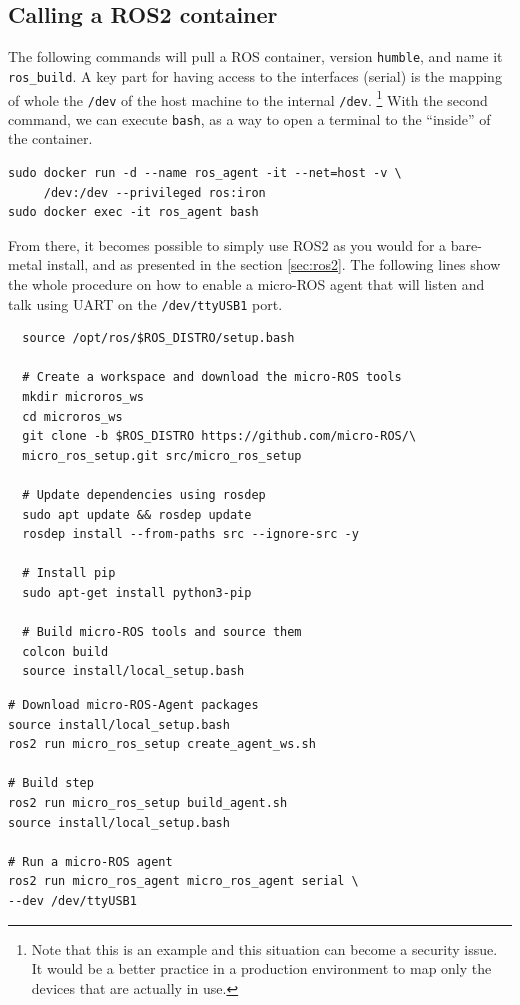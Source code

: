 \documentclass[10pt]{article}
\begin{document}
\subsection{Calling a ROS2 container}
The following commands will pull a ROS container, version \verb|humble|, and name it \verb|ros_build|.
A key part for having access to the interfaces (serial) is the mapping of whole the \verb|/dev| of  the host machine to the
internal \verb|/dev|. \footnote{Note that this is an example and this situation can become a security issue. It would be a better practice
in a production environment to map only the devices that are actually in use.}
With the second command, we can execute \verb|bash|, as a way to open a terminal to the ``inside'' of the container.
\begin{tcolorbox}
\begin{verbatim}
sudo docker run -d --name ros_agent -it --net=host -v \
     /dev:/dev --privileged ros:iron
sudo docker exec -it ros_agent bash
\end{verbatim}
\end{tcolorbox}

From there, it becomes possible to simply use ROS2 as you would for a bare-metal install, and as presented in the section \ref{sec:ros2}.
The following lines show the whole procedure on how to enable a micro-ROS agent that will listen and talk using UART on the \verb|/dev/ttyUSB1| port.
\begin{tcolorbox}
\begin{verbatim}
  source /opt/ros/$ROS_DISTRO/setup.bash

  # Create a workspace and download the micro-ROS tools
  mkdir microros_ws
  cd microros_ws
  git clone -b $ROS_DISTRO https://github.com/micro-ROS/\
  micro_ros_setup.git src/micro_ros_setup

  # Update dependencies using rosdep
  sudo apt update && rosdep update
  rosdep install --from-paths src --ignore-src -y

  # Install pip
  sudo apt-get install python3-pip

  # Build micro-ROS tools and source them
  colcon build
  source install/local_setup.bash
\end{verbatim}
\end{tcolorbox}

\begin{tcolorbox}
\begin{verbatim}
# Download micro-ROS-Agent packages
source install/local_setup.bash
ros2 run micro_ros_setup create_agent_ws.sh

# Build step
ros2 run micro_ros_setup build_agent.sh
source install/local_setup.bash

# Run a micro-ROS agent
ros2 run micro_ros_agent micro_ros_agent serial \
--dev /dev/ttyUSB1
\end{verbatim}
\end{tcolorbox}
\end{document}
